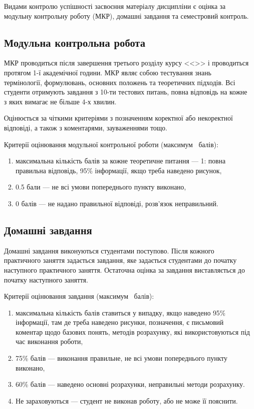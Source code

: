\documentclass{Syllabus}
\begin{document}
Видами контролю успішності засвоєння матеріалу дисципліни є оцінка за модульну контрольну роботу (МКР), домашні завдання та семестровий контроль.

\subsection*{Модульна контрольна робота}

МКР проводиться після завершення третього розділу курсу <<\discipline>> і проводиться протягом 1-ї академічної години. МКР являє собою тестування знань термінології, формулювань, основних положень та теоретичних підходів. Всі студенти отримують завдання з 10-ти тестових питань, повна відповідь на кожне з яких вимагає не більше 4-х хвилин.

Оцінюється за чіткими критеріями з позначенням коректної або некоректної відповіді, а також з коментарями, зауваженнями тощо.

Критерії оцінювання модульної контрольної роботи (максимум \mkrBal~балів):
\begin{enumerate}[label=$\bullet$]
    \item максимальна кількість балів за кожне теоретичне питання --- 1: повна правильна відповідь, 95\% інформації, якщо треба наведено рисунок, \item 0.5 бали --- не всі умови попереднього пункту виконано,
    \item 0 балів --- не надано правильної відповіді, розв’язок неправильний.
\end{enumerate}

\subsection*{Домашні завдання}

Домашні завдання виконуються студентами поступово. Після кожного практичного заняття задається завдання, яке задається студентами до початку наступного практичного заняття. Остаточна оцінка за завдання виставляється до початку наступного  заняття.

Критерії оцінювання завдання (максимум \dkrBal~балів):
\begin{enumerate}[label=$\bullet$]
    \item максимальна кількість балів ставиться у випадку, якщо наведено 95\% інформації, там де треба наведено рисунки, позначення, є письмовий коментар щодо базових понять, методів розрахунку, які використовуються під час виконання роботи,
    \item 75\% балів --- виконання правильне, не всі умови попереднього пункту виконано,
    \item 60\% балів --- наведено основні розрахунки, неправильні методи розрахунку.
    \item Не зараховуються --- студент не виконав роботу, або не може її пояснити.
\end{enumerate}
\end{document}
